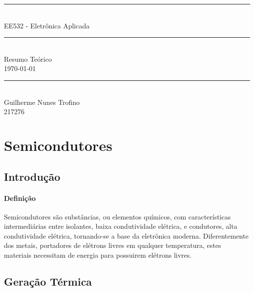 \documentclass{article}
\begin{document}
    \begin{titlepage}
        \begin{center}
            \rule{450pt}{0.5pt}\\[4mm]
            {\Huge EE532 - Eletrônica Aplicada}\\
            \rule{450pt}{0.5pt}\\[2mm]
            {\Large Resumo Teórico}\\[200mm]
            \today\\
            \rule{250pt}{0.5pt}\\
            {\large Guilherme Nunes Trofino}\\
            {\large 217276}\\
        \end{center}
    \end{titlepage}
\newpage

    \tableofcontents
\newpage

    \section{Semicondutores}
        \subsection{Introdução}
            \paragraph{Definição}Semicondutores são substâncias, ou elementos químicos, com características intermediárias entre isolantes, baixa condutividade elétrica, e condutores, alta condutividade elétrica, tornando-se a base da eletrônica moderna. Diferentemente dos metais, portadores de elétrons livres em qualquer temperatura, estes materiais necessitam de energia para possuirem elétrons livres.


        \subsection{Geração Térmica}
\end{document}
